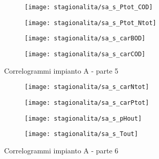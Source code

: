\begin{sidewaysfigure}[h]\ContinuedFloat
	\renewcommand*\thesubfigure{(\arabic{subfigure})}
	\begin{subfigure}{0.49\textwidth}
		\texttt{[image: stagionalita/sa\_s\_Ptot\_COD]}
		\caption{}
		\centering
	\end{subfigure}
	\begin{subfigure}{0.49\textwidth}
		\texttt{[image: stagionalita/sa\_s\_Ptot\_Ntot]}
		\caption{}
		\centering
	\end{subfigure}

	\begin{subfigure}{0.49\textwidth}
		\texttt{[image: stagionalita/sa\_s\_carBOD]}
		\caption{}
		\centering
	\end{subfigure}
	\begin{subfigure}{0.49\textwidth}
		\texttt{[image: stagionalita/sa\_s\_carCOD]}	
		\caption{}
		\centering
	\end{subfigure}
	\caption{Correlogrammi impianto A - parte 5}
\end{sidewaysfigure}

\begin{sidewaysfigure}[h]\ContinuedFloat
	\renewcommand*\thesubfigure{(\arabic{subfigure})}
	\begin{subfigure}{0.49\textwidth}
		\texttt{[image: stagionalita/sa\_s\_carNtot]}
		\caption{}
		\centering
	\end{subfigure}
	\begin{subfigure}{0.49\textwidth}
		\texttt{[image: stagionalita/sa\_s\_carPtot]}
		\caption{}
		\centering
	\end{subfigure}

	\begin{subfigure}{0.49\textwidth}
		\texttt{[image: stagionalita/sa\_s\_pHout]}
		\caption{}
		\centering
	\end{subfigure}
	\begin{subfigure}{0.49\textwidth}
		\texttt{[image: stagionalita/sa\_s\_Tout]}	
		\caption{}
		\label{fig:sa_s_Tout}
		\centering
	\end{subfigure}
	\caption{Correlogrammi impianto A - parte 6}
\end{sidewaysfigure}

